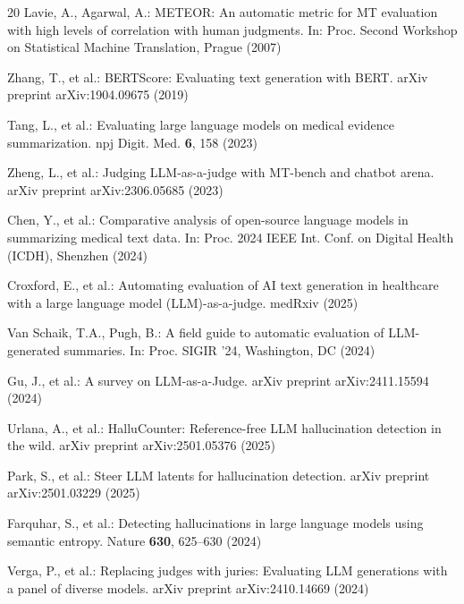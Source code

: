 \documentclass[runningheads]{llncs}
\begin{document}
\begin{thebibliography}{20}
Lavie, A., Agarwal, A.: METEOR: An automatic metric for MT evaluation with high levels of correlation with human judgments. In: Proc. Second Workshop on Statistical Machine Translation, Prague (2007)

Zhang, T., et al.: BERTScore: Evaluating text generation with BERT. arXiv preprint arXiv:1904.09675 (2019)

Tang, L., et al.: Evaluating large language models on medical evidence summarization. npj Digit. Med. \textbf{6}, 158 (2023)

Zheng, L., et al.: Judging LLM-as-a-judge with MT-bench and chatbot arena. arXiv preprint arXiv:2306.05685 (2023)

Chen, Y., et al.: Comparative analysis of open-source language models in summarizing medical text data. In: Proc. 2024 IEEE Int. Conf. on Digital Health (ICDH), Shenzhen (2024)

Croxford, E., et al.: Automating evaluation of AI text generation in healthcare with a large language model (LLM)-as-a-judge. medRxiv (2025)

Van Schaik, T.A., Pugh, B.: A field guide to automatic evaluation of LLM-generated summaries. In: Proc. SIGIR '24, Washington, DC (2024)

Gu, J., et al.: A survey on LLM-as-a-Judge. arXiv preprint arXiv:2411.15594 (2024)

Urlana, A., et al.: HalluCounter: Reference-free LLM hallucination detection in the wild. arXiv preprint arXiv:2501.05376 (2025)

Park, S., et al.: Steer LLM latents for hallucination detection. arXiv preprint arXiv:2501.03229 (2025)

Farquhar, S., et al.: Detecting hallucinations in large language models using semantic entropy. Nature \textbf{630}, 625--630 (2024)

Verga, P., et al.: Replacing judges with juries: Evaluating LLM generations with a panel of diverse models. arXiv preprint arXiv:2410.14669 (2024)
\end{thebibliography}
\end{document}

